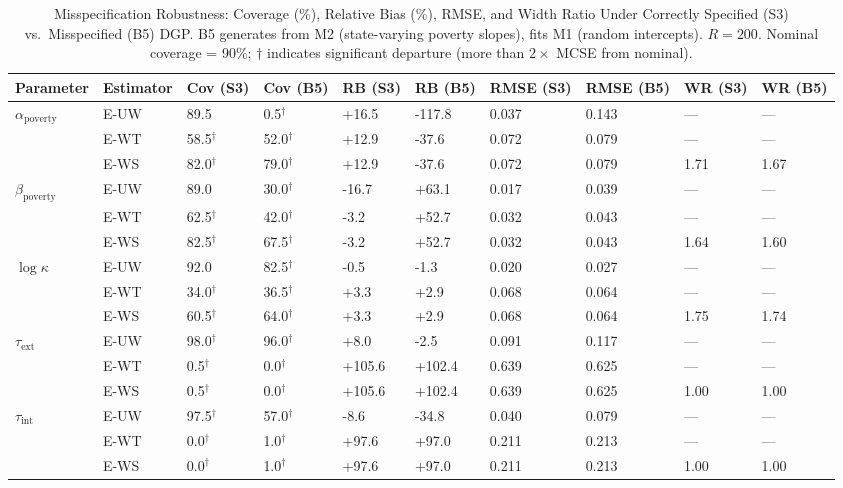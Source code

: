 \begin{table}[htbp]
\centering
\begin{tabular}{llllllllll}
  \toprule
Parameter & Estimator & Cov (S3) & Cov (B5) & RB (S3) & RB (B5) & RMSE (S3) & RMSE (B5) & WR (S3) & WR (B5) \\ 
  \midrule
$\alpha_{\text{poverty}}$ & E-UW & 89.5 & 0.5$^{\dagger}$ & +16.5 & -117.8 & 0.037 & 0.143 & --- & --- \\ 
   & E-WT & 58.5$^{\dagger}$ & 52.0$^{\dagger}$ & +12.9 & -37.6 & 0.072 & 0.079 & --- & --- \\ 
   & E-WS & 82.0$^{\dagger}$ & 79.0$^{\dagger}$ & +12.9 & -37.6 & 0.072 & 0.079 & 1.71 & 1.67 \\ 
  $\beta_{\text{poverty}}$ & E-UW & 89.0 & 30.0$^{\dagger}$ & -16.7 & +63.1 & 0.017 & 0.039 & --- & --- \\ 
   & E-WT & 62.5$^{\dagger}$ & 42.0$^{\dagger}$ & -3.2 & +52.7 & 0.032 & 0.043 & --- & --- \\ 
   & E-WS & 82.5$^{\dagger}$ & 67.5$^{\dagger}$ & -3.2 & +52.7 & 0.032 & 0.043 & 1.64 & 1.60 \\ 
  $\log\kappa$ & E-UW & 92.0 & 82.5$^{\dagger}$ & -0.5 & -1.3 & 0.020 & 0.027 & --- & --- \\ 
   & E-WT & 34.0$^{\dagger}$ & 36.5$^{\dagger}$ & +3.3 & +2.9 & 0.068 & 0.064 & --- & --- \\ 
   & E-WS & 60.5$^{\dagger}$ & 64.0$^{\dagger}$ & +3.3 & +2.9 & 0.068 & 0.064 & 1.75 & 1.74 \\ 
  $\tau_{\text{ext}}$ & E-UW & 98.0$^{\dagger}$ & 96.0$^{\dagger}$ & +8.0 & -2.5 & 0.091 & 0.117 & --- & --- \\ 
   & E-WT & 0.5$^{\dagger}$ & 0.0$^{\dagger}$ & +105.6 & +102.4 & 0.639 & 0.625 & --- & --- \\ 
   & E-WS & 0.5$^{\dagger}$ & 0.0$^{\dagger}$ & +105.6 & +102.4 & 0.639 & 0.625 & 1.00 & 1.00 \\ 
  $\tau_{\text{int}}$ & E-UW & 97.5$^{\dagger}$ & 57.0$^{\dagger}$ & -8.6 & -34.8 & 0.040 & 0.079 & --- & --- \\ 
   & E-WT & 0.0$^{\dagger}$ & 1.0$^{\dagger}$ & +97.6 & +97.0 & 0.211 & 0.213 & --- & --- \\ 
   & E-WS & 0.0$^{\dagger}$ & 1.0$^{\dagger}$ & +97.6 & +97.0 & 0.211 & 0.213 & 1.00 & 1.00 \\ 
   \bottomrule
\end{tabular}
\caption{Misspecification Robustness: Coverage (\%), Relative Bias (\%), RMSE, and Width Ratio Under Correctly Specified (S3) vs.\ Misspecified (B5) DGP. B5 generates from M2 (state-varying poverty slopes), fits M1 (random intercepts). $R = 200$. Nominal coverage = 90\%; $\dagger$ indicates significant departure (more than $2 \times$ MCSE from nominal).} 
\end{table}
